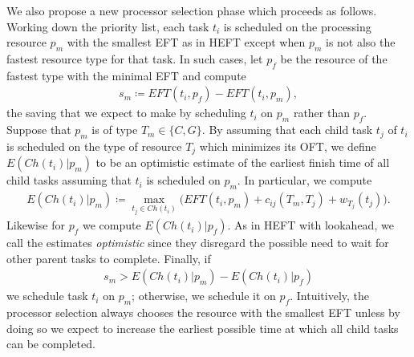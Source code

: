 \documentclass[runningheads]{llncs}
\begin{document}
We also propose a new processor selection phase which proceeds as follows. Working down the priority list, each task $t_i$ is scheduled on the processing resource $p_{m}$ with the smallest EFT as in HEFT except when $p_m$ is not also the fastest resource type for that task. In such cases, let $p_f$ be the resource of the fastest type with the minimal EFT and compute 
\begin{align}
\label{eq.sm}
s_m \coloneqq EFT(t_i, p_f) - EFT(t_i, p_m),
\end{align}
the saving that we expect to make by scheduling $t_i$ on $p_m$ rather than $p_f$. Suppose that $p_m$ is of type $T_m \in \{C, G\}$. By assuming that each child task $t_j$ of $t_i$ is scheduled on the type of resource $T_j$ which minimizes its OFT, we define $E(Ch(t_i) | p_m)$ to be an optimistic estimate of the earliest finish time of all child tasks assuming that $t_i$ is scheduled on $p_m$. In particular, we compute
\begin{align}
\label{eq.oft_children}
E(Ch(t_i) | p_m) \coloneqq \max_{t_j \in Ch(t_i)} \Big( EFT(t_i, p_m) + c_{ij}(T_m, T_j) + w_{T_j}(t_j)\Big).
\end{align}
Likewise for $p_f$ we compute $E(Ch(t_i) | p_f)$. As in HEFT with lookahead, we call the estimates {\em optimistic} since they disregard the possible need to wait for other parent tasks to complete. Finally, if
\begin{align}
\label{eq.cross_condition}
s_m > E(Ch(t_i) | p_m) - E(Ch(t_i) | p_f)
\end{align}
we schedule task $t_i$ on $p_m$; otherwise, we schedule it on $p_f$. Intuitively, the processor selection always chooses the resource with the smallest EFT unless by doing so we expect to increase the earliest possible time at which all child tasks can be completed.
\end{document}
